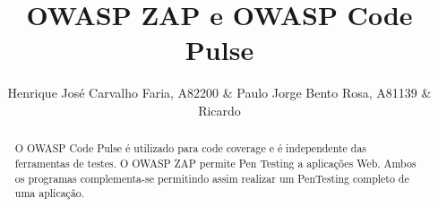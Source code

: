 %
\title{OWASP ZAP e OWASP Code Pulse}
%
%

\author{Henrique José Carvalho Faria, A82200 \&  Paulo Jorge Bento Rosa, A81139 \& Ricardo }
%
%
%
\maketitle              %
%
\begin{abstract}

O OWASP Code Pulse é utilizado para code coverage e é independente das ferramentas de testes. O OWASP ZAP permite Pen Testing a aplicações Web. Ambos os programas complementa-se permitindo assim realizar um PenTesting completo de uma aplicação.

\end{abstract}
%
%








